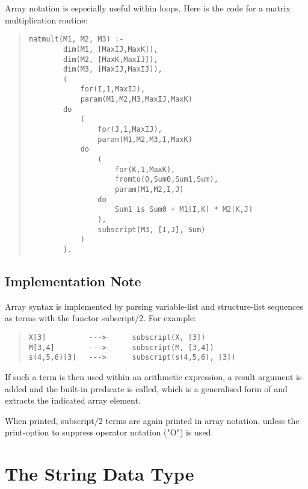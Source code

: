Array notation is especially useful within loops.
Here is the code for a matrix multiplication routine:
\begin{quote}\begin{verbatim}
matmult(M1, M2, M3) :-
        dim(M1, [MaxIJ,MaxK]),
        dim(M2, [MaxK,MaxIJ]),
        dim(M3, [MaxIJ,MaxIJ]),
        (
            for(I,1,MaxIJ),
            param(M1,M2,M3,MaxIJ,MaxK)
        do
            (
                for(J,1,MaxIJ),
                param(M1,M2,M3,I,MaxK)
            do
                (
                    for(K,1,MaxK),
                    fromto(0,Sum0,Sum1,Sum),
                    param(M1,M2,I,J)
                do
                    Sum1 is Sum0 + M1[I,K] * M2[K,J]
                ),
                subscript(M3, [I,J], Sum)
            )
        ).
\end{verbatim}\end{quote}



\subsection{Implementation Note}

Array syntax is implemented by parsing variable-list and
structure-list sequences as terms with the functor subscript/2.
For example:
\begin{quote}\begin{verbatim}
X[3]          --->      subscript(X, [3])
M[3,4]        --->      subscript(M, [3,4])
s(4,5,6)[3]   --->      subscript(s(4,5,6), [3])
\end{verbatim}\end{quote}
If such a term is then used within an arithmetic expression,
a result argument is added and the built-in predicate
is called, which is a generalised form of
and extracts the indicated array element.

When printed, subscript/2 terms are again printed in array notation,
unless the print-option to suppress operator notation ("O") is used.


\section{The String Data Type}
\label{chapstring}

